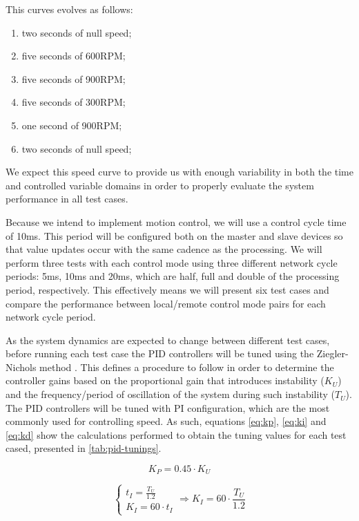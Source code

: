 This curves evolves as follows:
\begin{enumerate}
	\item two seconds of null speed;
	\item five seconds of 600RPM;
	\item five seconds of 900RPM;
	\item five seconds of 300RPM;
	\item one second of 900RPM;
	\item two seconds of null speed;
\end{enumerate}
We expect this speed curve to provide us with enough variability in both the time and controlled variable domains in order to properly evaluate the system performance in all test cases.

Because we intend to implement motion control, we will use a control cycle time of 10ms.
This period will be configured both on the master and slave devices so that value updates occur with the same cadence as the processing.
We will perform three tests with each control mode using three different network cycle periods: 5ms, 10ms and 20ms, which are half, full and double of the processing period, respectively.
This effectively means we will present six test cases and compare the performance between local/remote control mode pairs for each network cycle period.

As the system dynamics are expected to change between different test cases, before running each test case the PID controllers will be tuned using the Ziegler-Nichols method \cite{pid:zn-method}.
This defines a procedure to follow in order to determine the controller gains based on the proportional gain that introduces instability ($K_U$) and the frequency/period of oscillation of the system during such instability ($T_U$).
The PID controllers will be tuned with PI configuration, which are the most commonly used for controlling speed.
As such, equations \ref{eq:kp}, \ref{eq:ki} and \ref{eq:kd} show the calculations performed to obtain the tuning values for each test cased, presented in \autoref{tab:pid-tunings}.

\begin{equation}
	K_P = 0.45 \cdot K_U
	\label{eq:kp}
\end{equation}

\begin{equation}
	\begin{cases}
		 t_I = \frac{T_U}{1.2} \\
		 K_I = 60 \cdot t_I
	\end{cases}
	\Rightarrow
	K_I = 60 \cdot \frac{T_U}{1.2}
	\label{eq:ki}
\end{equation}

